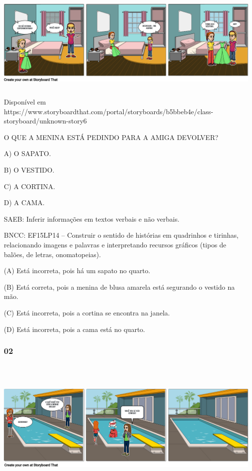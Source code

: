 \includegraphics[width=5.90556in,height=1.95278in]{media/image180.png}

Disponível em
https://www.storyboardthat.com/portal/storyboards/b5bbeb4e/class-storyboard/unknown-story6

O QUE A MENINA ESTÁ PEDINDO PARA A AMIGA DEVOLVER?

A) O SAPATO.

B) O VESTIDO.

C) A CORTINA.

D) A CAMA.

SAEB: Inferir informações em textos verbais e não verbais.

BNCC: EF15LP14 -- Construir o sentido de histórias em
quadrinhos e tirinhas, relacionando imagens e palavras e interpretando
recursos gráficos (tipos de balões, de letras, onomatopeias).

(A) Está incorreta, pois há um sapato no quarto.

(B) Está correta, pois a menina de blusa amarela está segurando o vestido na mão.

(C) Está incorreta, pois a cortina se encontra na janela.

(D) Está incorreta, pois a cama está no quarto.

\subsubsection{02 }\label{section-24}

\includegraphics[width=6.12986in,height=2.72778in]{media/image181.png}


